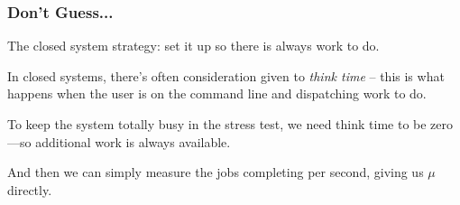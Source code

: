 \begin{frame}
\frametitle{Don't Guess...}

The closed system strategy: set it up so there is always work to do. 

In closed systems, there's often consideration given to \textit{think time} -- this is what happens when the user is on the command line and dispatching work to do. 

To keep the system totally busy in the stress test, we need think time to be zero---so additional work is always available. 

And then we can simply measure the jobs completing per second, giving us $\mu$ directly.


\end{frame}





